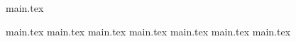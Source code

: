 \documentclass[10pt,a4paper,titlepage]{report}
\begin{document}
{main.tex}

\newpage
{main.tex}
\newpage
{main.tex}
	{main.tex}
{main.tex}
{main.tex}
\newpage
\newpage
{main.tex}
{main.tex}

\printbibliography
\end{document}
